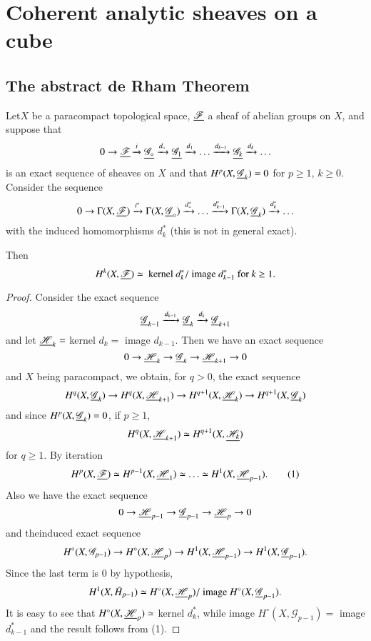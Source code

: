 
\chapter{Coherent analytic sheaves on a cube}\label{chap14}

\section{The abstract de Rham Theorem}\label{chap14:sec1}

Let\pageoriginale $X$ be a paracompact topological space,
$\underline{\mathscr{F}}$ a sheaf of abelian groups on $X$, and suppose that 
$$
0 \to \underline{\mathscr{F}} \xrightarrow{i} \underline{\mathscr{G}_\circ}
\xrightarrow{d_\circ} \underline{\mathscr{G}_1} \xrightarrow{d_1} \ldots
\xrightarrow{d_{k-1}} \underline{\mathscr{G}_k} \xrightarrow{d_k} \ldots 
$$
is an exact sequence of sheaves on $X$ and that $H^p(X,
\underline{\mathscr{G}}_k) = 0$ for $p \geq 1$, $k \geq 0$. Consider the
sequence
$$
0 \to \Gamma (X, \underline{\mathscr{F}}) \xrightarrow{i^\ast} \Gamma (X,
\underline{\mathscr{G}}_\circ)  \xrightarrow{d^\ast_\circ} \ldots
\xrightarrow{d^\ast_{k-1}} \Gamma (X, \underline{\mathscr{G}}_k)
\xrightarrow{d^\ast_k} \ldots 
$$ 
with the induced homomorphisms $d^\ast_k$ (this is not in general
exact). 

Then 
$$
H^k (X, \underline{\mathscr{F}}) \simeq \text{ kernel } d^\ast_k/ \text{ image
} d^\ast_{k-1} \text{ for } k \geq 1. 
$$

\begin{proof}
Consider the exact sequence
$$
\underline{\mathscr{G}}_{k-1} \xrightarrow{d_{k-1}} \underline{\mathscr{G}}_k
\xrightarrow{d_k} \underline{\mathscr{G}}_{k+1}
$$
and let $\underline{\mathscr{H}}_k = $ kernel $d_k = $ image $d_{k-1}$. Then
we have an exact sequence 
$$
0 \to \underline{\mathscr{H}}_k \to \underline{\mathscr{G}}_k \to
\underline{\mathscr{H}}_{k+1} \to 0
$$
and $X$ being paracompact, we obtain, for $q > 0$, the exact sequence
$$
H^q (X, \underline{\mathscr{G}}_k) \to H^q (X, \underline{\mathscr{H}}_{k+1}) \to
H^{q+1} (X , \underline{\mathscr{H}}_k) \to H^{q+1}(X, \underline{\mathscr{G}}_k) 
$$
and since $H^p (X, \underline{\mathscr{G}}_k) = 0$, if $ p \geq 1$,
$$
H^q (X, \underline{\mathscr{H}}_{k+1}) \simeq H^{q+1} (X, \underline{\mathscr{H}_k})
$$
for $q \geq 1$. By iteration
\begin{equation*}
H^p(X, \underline{\mathscr{F}}) \simeq H^{p-1} (X, \underline{\mathscr{H}}_1) \simeq
\ldots \simeq H^1(X, \underline{\mathscr{H}}_{p-1}).  \tag{1}
\end{equation*}
Also we have the exact sequence
$$
0 \to \underline{\mathscr{H}}_{p-1} \to \underline{\mathscr{G}}_{p-1} \to
\underline{\mathscr{H}}_p \to 0
$$
and the\pageoriginale induced exact sequence
$$
H^\circ (X, \mathscr{G}_{p-1}) \to H^\circ (X, \underline{\mathscr{H}}_p) \to
H^1 (X, \underline{\mathscr{H}}_{p-1}) \to H^1 (X, \underline{\mathscr{G}}_{p-1}). 
$$
Since the last term is $0$ by hypothesis,
$$
H^1 (X, \bar{H}_{p-1}) \simeq H^\circ (X, \underline{\mathscr{H}}_p)/ \text{
  image } H^\circ (X, \underline{\mathscr{G}}_{p-1}). 
$$
It is easy to see that $H^\circ (X,\underline{\mathscr{H}}_p) \simeq $ kernel
$d^\ast_k$, while image $H^\circ (X, \mathscr{G}_{p-1}) = $ image
$d^\ast_{k-1}$ and the result follows from (1).
\end{proof}

